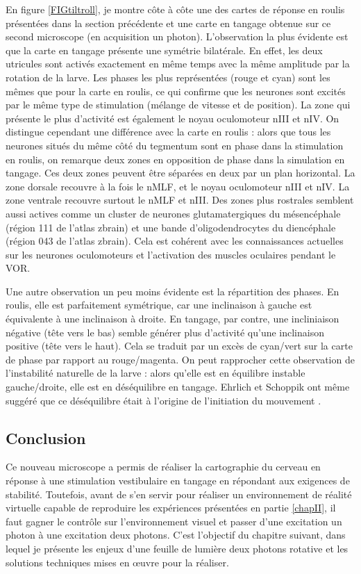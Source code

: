 En figure \ref{FIGtiltroll}, je montre côte à côte une des cartes de réponse en roulis présentées dans la section précédente et une carte en tangage obtenue sur ce second microscope (en acquisition un photon). L'observation la plus évidente est que la carte en tangage présente une symétrie bilatérale. En effet, les deux utricules sont activés exactement en même temps avec la même amplitude par la rotation de la larve. Les phases les plus représentées (rouge et cyan) sont les mêmes que pour la carte en roulis, ce qui confirme que les neurones sont excités par le même type de stimulation (mélange de vitesse et de position). La zone qui présente le plus d'activité est également le noyau oculomoteur nIII et nIV. On distingue cependant une différence avec la carte en roulis : alors que tous les neurones situés du même côté du tegmentum sont en phase dans la stimulation en roulis, on remarque deux zones en opposition de phase dans la simulation en tangage. Ces deux zones peuvent être séparées en deux par un plan horizontal. La zone dorsale recouvre à la fois le nMLF, et le noyau oculomoteur nIII et nIV. La zone ventrale recouvre surtout le nMLF et nIII. Des zones plus rostrales semblent aussi actives comme un cluster de neurones glutamatergiques du mésencéphale (région 111 de l'atlas zbrain) et une bande d'oligodendrocytes du diencéphale (région 043 de l'atlas zbrain). Cela est cohérent avec les connaissances actuelles sur les neurones oculomoteurs \cite{schoppik_gaze-stabilizing_2017} et l'activation des muscles oculaires pendant le VOR.


Une autre observation un peu moins évidente est la répartition des phases. En roulis, elle est parfaitement symétrique, car une inclinaison à gauche est équivalente à une inclinaison à droite. En tangage, par contre, une incliniaison négative (tête vers le bas) semble générer plus d'activité qu'une inclinaison positive (tête vers le haut). Cela se traduit par un excès de cyan/vert sur la carte de phase par rapport au rouge/magenta. On peut rapprocher cette observation de l'instabilité naturelle de la larve : alors qu'elle est en équilibre instable gauche/droite, elle est en déséquilibre en tangage. Ehrlich et Schoppik ont même suggéré que ce déséquilibre était à l'origine de l'initiation du mouvement \cite{ehrlich_control_2017}.

\subsection{Conclusion}

Ce nouveau microscope a permis de réaliser la cartographie du cerveau en réponse à une stimulation vestibulaire en tangage en répondant aux exigences de stabilité. Toutefois, avant de s'en servir pour réaliser un environnement de réalité virtuelle capable de reproduire les expériences présentées en partie \ref{chapII}, il faut gagner le contrôle sur l'environnement visuel et passer d'une excitation un photon à une excitation deux photons. C'est l'objectif du chapitre suivant, dans lequel je présente les enjeux d'une feuille de lumière deux photons rotative et les solutions techniques mises en œuvre pour la réaliser.